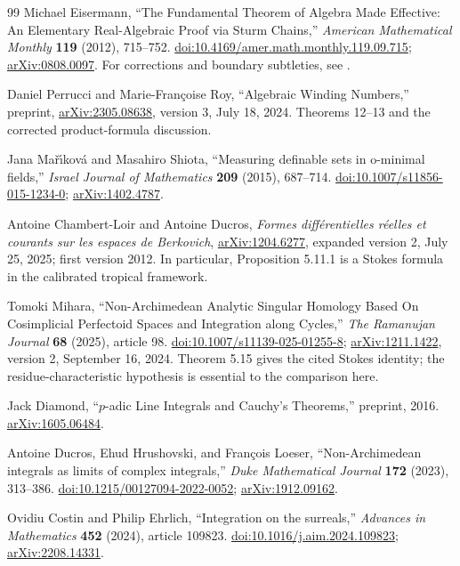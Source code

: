 \documentclass[11pt,letterpaper]{article}
\theoremstyle{definition}
\theoremstyle{remark}
\numberwithin{equation}{section}
\begin{document}
\begin{thebibliography}{99}
Michael Eisermann,
``The Fundamental Theorem of Algebra Made Effective: An Elementary Real-Algebraic Proof via Sturm Chains,''
\emph{American Mathematical Monthly} \textbf{119} (2012), 715--752.
\href{https://doi.org/10.4169/amer.math.monthly.119.09.715}{doi:10.4169/amer.math.monthly.119.09.715};
\href{https://arxiv.org/abs/0808.0097}{arXiv:0808.0097}.
For corrections and boundary subtleties, see \cite{PR}.

Daniel Perrucci and Marie-Fran\c coise Roy,
``Algebraic Winding Numbers,'' preprint,
\href{https://arxiv.org/abs/2305.08638}{arXiv:2305.08638}, version 3, July 18, 2024.
Theorems 12--13 and the corrected product-formula discussion.

Jana Ma\v r\'{\i}kov\'{a} and Masahiro Shiota,
``Measuring definable sets in o-minimal fields,''
\emph{Israel Journal of Mathematics} \textbf{209} (2015), 687--714.
\href{https://doi.org/10.1007/s11856-015-1234-0}{doi:10.1007/s11856-015-1234-0};
\href{https://arxiv.org/abs/1402.4787}{arXiv:1402.4787}.

Antoine Chambert-Loir and Antoine Ducros,
\emph{Formes diff\'erentielles r\'eelles et courants sur les espaces de Berkovich},
\href{https://arxiv.org/abs/1204.6277}{arXiv:1204.6277},
expanded version 2, July 25, 2025; first version 2012.
In particular, Proposition 5.11.1 is a Stokes formula in the calibrated tropical framework.

Tomoki Mihara,
``Non-Archimedean Analytic Singular Homology Based On Cosimplicial Perfectoid Spaces and Integration along Cycles,''
\emph{The Ramanujan Journal} \textbf{68} (2025), article 98.
\href{https://doi.org/10.1007/s11139-025-01255-8}{doi:10.1007/s11139-025-01255-8};
\href{https://arxiv.org/abs/1211.1422}{arXiv:1211.1422}, version 2, September 16, 2024.
Theorem 5.15 gives the cited Stokes identity; the residue-characteristic hypothesis is essential to the comparison here.

Jack Diamond, ``$p$-adic Line Integrals and Cauchy's Theorems,''
preprint, 2016.
\href{https://arxiv.org/abs/1605.06484}{arXiv:1605.06484}.

Antoine Ducros, Ehud Hrushovski, and Fran\c cois Loeser,
``Non-Archimedean integrals as limits of complex integrals,''
\emph{Duke Mathematical Journal} \textbf{172} (2023), 313--386.
\href{https://doi.org/10.1215/00127094-2022-0052}{doi:10.1215/00127094-2022-0052};
\href{https://arxiv.org/abs/1912.09162}{arXiv:1912.09162}.

Ovidiu Costin and Philip Ehrlich,
``Integration on the surreals,''
\emph{Advances in Mathematics} \textbf{452} (2024), article 109823.
\href{https://doi.org/10.1016/j.aim.2024.109823}{doi:10.1016/j.aim.2024.109823};
\href{https://arxiv.org/abs/2208.14331}{arXiv:2208.14331}.

\end{thebibliography}
\end{document}
